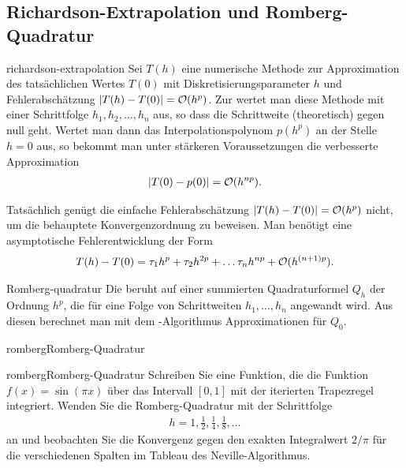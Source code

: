 \subsection{Richardson-Extrapolation und Romberg-Quadratur}

\begin{Definition}{richardson-extrapolation}
  Sei $T(h)$ eine numerische Methode zur Approximation des
  tatsächlichen Wertes $T(0)$ mit Diskretisierungsparameter $h$ und
  Fehlerabschätzung $\lvert T(h)-T(0)\rvert = \mathcal O(h^p)$. Zur
   wertet man diese Methode mit einer
  Schrittfolge $h_1, h_2,\ldots,h_n$ aus, so dass die Schrittweite
  (theoretisch) gegen null geht. Wertet man dann das
  Interpolationspolynom $p(h^p)$ an der Stelle $h=0$ aus, so bekommt
  man unter stärkeren Voraussetzungen die verbesserte Approximation
  \begin{gather}
    \lvert T(0)-p(0)\rvert = \mathcal O(h^{np}).
  \end{gather}
\end{Definition}

\begin{remark}
  Tatsächlich genügt die einfache Fehlerabschätzung
  $\lvert T(h)-T(0)\rvert = \mathcal O(h^p)$ nicht, um die behauptete
  Konvergenzordnung zu beweisen. Man benötigt eine asymptotische
  Fehlerentwicklung der Form
  \begin{gather}
    T(h)-T(0) = \tau_1 h^p + \tau_2 h^{2p} + \dots \tau_n h^{np}
    + \mathcal O(h^{(n+1)p}).
  \end{gather}
\end{remark}

\begin{Definition}{Romberg-quadratur}
  Die  beruht auf einer summierten
  Quadraturformel $Q_h$ der Ordnung $h^p$, die für eine Folge von
  Schrittweiten $h_1,\dots, h_n$ angewandt wird. Aus diesen berechnet
  man mit dem -Algorithmus Approximationen für
  $Q_0$.
\end{Definition}

\begin{Algorithmus*}{romberg}{Romberg-Quadratur}
  
\end{Algorithmus*}

\begin{Aufgabe*}{romberg}{Romberg-Quadratur}
  Schreiben Sie eine Funktion, die die Funktion $f(x) = \sin(\pi x)$
  über das Intervall $[0,1]$ mit der iterierten Trapezregel
  integriert. Wenden Sie die Romberg-Quadratur mit der Schrittfolge
  \begin{gather}
    h = 1,\frac12,\frac14,\frac18,\dots
  \end{gather}
  an und beobachten Sie die Konvergenz gegen den exakten Integralwert
  $2/\pi$ für die verschiedenen Spalten im Tableau des
  Neville-Algorithmus.
\end{Aufgabe*}

